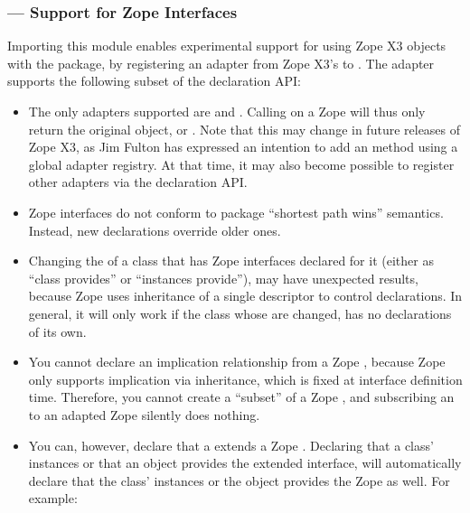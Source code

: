 \begin{verbatim%
}
\begin{verbatim%
}
\begin{verbatim%
}
\begin{verbatim%
}
\begin{verbatim%
}
\begin{verbatim%
}
\newpage
\subsubsection{ --- Support for Zope Interfaces}

Importing this module enables experimental support for using Zope X3
 objects with the  package, by registering
an adapter from Zope X3's  to .  The
adapter supports the following subset of the declaration API:

\begin{itemize}

\item The only adapters supported are  and
.  Calling  on a Zope
 will thus only return the original object, or .
Note that this may change in future releases of Zope X3, as Jim Fulton has
expressed an intention to add an  method using a global
adapter registry.   At that time, it may also become possible to register
other adapters via the  declaration API.

\item Zope interfaces do not conform to  package ``shortest
path wins'' semantics.  Instead, new declarations override older ones.

\item Changing the  of a class that has Zope interfaces
declared for it (either as ``class provides'' or ``instances provide''), may
have unexpected results, because Zope uses inheritance of a single descriptor
to control declarations.  In general, it will only work if the class whose
 are changed, has no declarations of its own.

\item You cannot declare an implication relationship from a Zope
, because Zope only supports implication via
inheritance, which is fixed at interface definition time.  Therefore, you cannot
create a ``subset'' of a Zope , and subscribing an
 to an adapted Zope 
silently does nothing.

\item You can, however, declare that a  extends a
Zope .  Declaring that a class' instances or that an object
provides the extended interface, will automatically declare that the class'
instances or the object provides the Zope  as well.  For
example:



\end{itemize}
\end{verbatim%
}
\end{verbatim%
}
\end{verbatim%
}
\end{verbatim%
}
\end{verbatim%
}
\end{verbatim%
}
